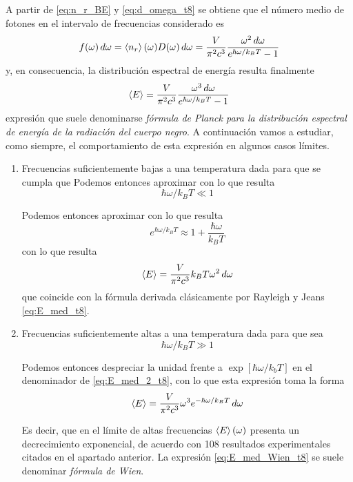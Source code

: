 A partir de \eqref{eq:n_r_BE} y \eqref{eq:d_omega_t8} se obtiene que el número medio de fotones en el intervalo de frecuencias considerado es
\begin{equation}\label{eq:f_omega_t8}
	f(\omega) \dd{\omega} = \expval{n_r}(\omega) D(\omega) \dd{\omega} = \frac{V}{\pi^2 c^3}\frac{\omega^2 \dd{\omega}}{e^{\hbar\omega / k_BT} - 1}
\end{equation}
y, en consecuencia, la distribución espectral de energía resulta finalmente
\begin{equation}\label{eq:E_med_2_t8}
	\expval{E} = \frac{V}{\pi^2 c^3}\frac{\omega^3 \dd{\omega}}{e^{\hbar\omega / k_BT} - 1}
\end{equation}
expresión que suele denominarse \emph{fórmula de Planck para la distribución espectral de energía de la radiación del cuerpo negro}.
A continuación vamos a estudiar, como siempre, el comportamiento de esta expresión en algunos casos límites.
\begin{enumerate}
	\item Frecuencias suficientemente bajas a una temperatura dada para que se cumpla que Podemos entonces aproximar con lo que resulta
	\begin{equation}
		\hbar\omega/k_B T \ll 1
	\end{equation}

	Podemos entonces aproximar con lo que resulta
	\begin{equation}
		e^{\hbar\omega / k_BT} \approx 1 + \frac{\hbar\omega}{k_B T}
	\end{equation}
	con lo que resulta
	\begin{equation}
		\expval{E} = \frac{V}{\pi^2 c^3} k_B T \omega^2 \dd{\omega}
	\end{equation}
	que coincide con la fórmula derivada clásicamente por Rayleigh y Jeans \eqref{eq:E_med_t8}.

	\item Frecuencias suficientemente altas a una temperatura dada para que sea
	\begin{equation}
		\hbar\omega/k_B T \gg 1
	\end{equation}

	Podemos entonces despreciar la unidad frente a $\exp[\hbar\omega / k_bT]$ en el denominador de \eqref{eq:E_med_2_t8}, con lo que esta expresión toma la forma
	\begin{equation}\label{eq:E_med_Wien_t8}
		\expval{E} = \frac{V}{\pi^2 c^3} \omega^3 e^{-\hbar\omega / k_BT} \dd{\omega}
	\end{equation}

	Es decir, que en el límite de altas frecuencias $\expval{E}(\omega)$ presenta un decrecimiento exponencial, de acuerdo con 108 resultados experimentales citados en el apartado anterior.
	La expresión \eqref{eq:E_med_Wien_t8} se suele denominar \emph{fórmula de Wien}.
\end{enumerate}

